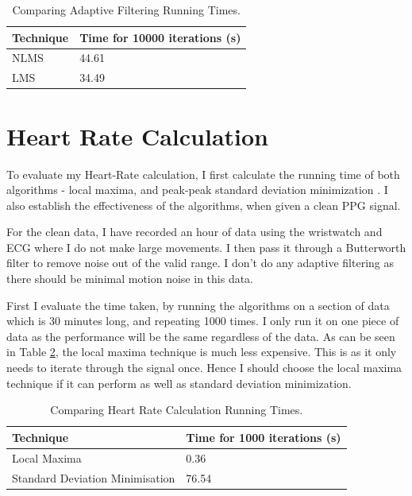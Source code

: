\documentclass[12pt,a4paper,twoside,openright]{report}
\begin{document}
\begin{table}[H]
\centering
\caption{Comparing Adaptive Filtering Running Times.}
\label{table:lms-nlms-time}
\begin{tabular}{|l|l|}
\hline
Technique               & Time for 10000 iterations (s) \\ \hline
NLMS                    & 44.61                         \\
LMS                     & 34.49                         \\
\hline
\end{tabular}
\end{table}


\section{Heart Rate Calculation}

To evaluate my Heart-Rate calculation, I first calculate the running time of
both algorithms - local maxima, and peak-peak standard deviation minimization
. I also establish the effectiveness of the algorithms, when given a clean
PPG signal.

For the clean data, I have recorded an hour of data using the wristwatch and ECG
where I do not make large movements. I then pass it through a Butterworth filter to remove
noise out of the valid range. I don't do any adaptive filtering as
there should be minimal motion noise in this data.

First I evaluate the time taken, by running the algorithms on a section of
data which is 30 minutes long, and repeating 1000 times. I only run it on one
piece of data as the performance will be the same regardless of the data. 
As can be seen in Table \ref{table:hr-times},
the local maxima technique is much less expensive. This is as it only needs to
iterate through the signal once. Hence I should choose the local maxima
technique if it can perform as well as standard deviation minimization.

\begin{table}[]
\centering
\caption{Comparing Heart Rate Calculation Running Times.}
\label{table:hr-times}
\begin{tabular}{|l|l|}
\hline
Technique                       & Time for 1000 iterations (s) \\ \hline
Local Maxima                    & 0.36                         \\
Standard Deviation Minimisation & 76.54                        \\
\hline
\end{tabular}
\end{table}
\end{document}
